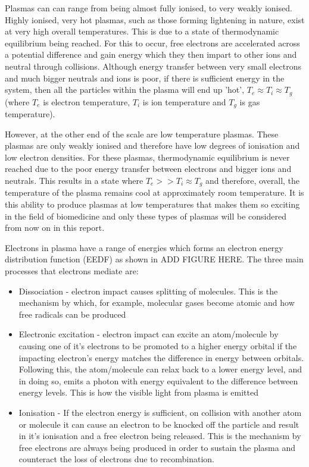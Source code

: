\documentclass[11pt, oneside]{article}   	%
\begin{document}
Plasmas can can range from being almost fully ionised, to very weakly ionised.
Highly ionised, very hot plasmas, such as those forming lightening in nature, exist at very high overall temperatures. 
This is due to a state of thermodynamic equilibrium being reached. 
For this to occur, free electrons are accelerated across a potential difference and gain energy which they then impart to other ions and neutral through collisions.
Although energy transfer between very small electrons and much bigger neutrals and ions is poor, if there is sufficient energy in the system, then all the particles within the plasma will end up 'hot', $T_e \approx T_i \approx T_g$ (where $T_e$ is electron temperature, $T_i$ is ion temperature and $T_g$ is gas temperature).

However, at the other end of the scale are low temperature plasmas. 
These plasmas are only weakly ionised and therefore have low degrees of ionisation and low electron densities.
For these plasmas, thermodynamic equilibrium is never reached due to the poor energy transfer between electrons and bigger ions and neutrals. 
This results in a state where $T_e >> T_i \approx T_g$ and therefore, overall, the temperature of the plasma remains cool at approximately room temperature.
It is this ability to produce plasmas at low temperatures that makes them so exciting in the field of biomedicine and only these types of plasmas will be considered from now on in this report.

Electrons in plasma have a range of energies which forms an electron energy distribution function (EEDF) as shown in ADD FIGURE HERE.
The three main processes that electrons mediate are:
\begin{itemize}
\item Dissociation - electron impact causes splitting of molecules. This is the mechanism by which, for example, molecular gases become atomic and how free radicals can be produced
\item Electronic excitation - electron impact can excite an atom/molecule by causing one of it's electrons to be promoted to a higher energy orbital if the impacting electron's energy matches the difference in energy between orbitals. Following this, the atom/molecule can relax back to a lower energy level, and in doing so, emits a photon with energy equivalent to the difference between energy levels. This is how the visible light from plasma is emitted
\item Ionisation - If the electron energy is sufficient, on collision with another atom or molecule it can cause an electron to be knocked off the particle and result in it's ionisation and a free electron being released. This is the mechanism by free electrons are always being produced in order to sustain the plasma and counteract the loss of electrons due to recombination.
\end{itemize}
\end{document}
